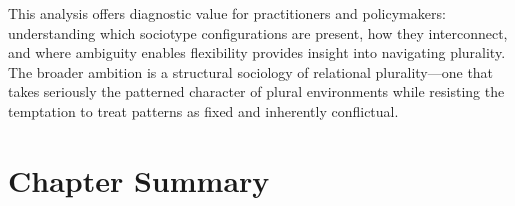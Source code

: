 \documentclass[../main.tex]{subfiles}
\begin{document}
This analysis offers diagnostic value for practitioners and policymakers: understanding which sociotype configurations are present, how they interconnect, and where ambiguity enables flexibility provides insight into navigating plurality. The broader ambition is a structural sociology of relational plurality---one that takes seriously the patterned character of plural environments while resisting the temptation to treat patterns as fixed and inherently conflictual.


\section{Chapter Summary}
\end{document}
